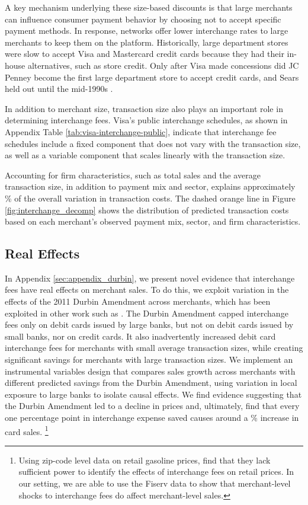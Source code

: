 \documentclass[main.tex]{subfiles}
\begin{document}
A key mechanism underlying these size-based discounts is that large merchants can influence consumer payment behavior by choosing not to accept specific payment methods.
In response, networks offer lower interchange rates to large merchants to keep them on the platform.
Historically, large department stores were slow to accept Visa and Mastercard credit cards because they had their in-house alternatives, such as store credit.
Only after Visa made concessions did JC Penney become the first large department store to accept credit cards, and Sears held out until the mid-1990s \citep{Nocera1995}.

In addition to merchant size, transaction size also plays an important role in determining interchange fees.
Visa's public interchange schedules, as shown in Appendix Table \ref{tab:visa-interchange-public}, indicate that interchange fee schedules include a fixed component that does not vary with the transaction size, as well as a variable component that scales linearly with the transaction size.

Accounting for firm characteristics, such as total sales and the average transaction size, in addition to payment mix and sector, explains approximately \% of the overall variation in transaction costs.
The dashed orange line in Figure \ref{fig:interchange_decomp} shows the distribution of predicted transaction costs based on each merchant's observed payment mix, sector, and firm characteristics.

\subsection{Real Effects}

In Appendix \ref{sec:appendix_durbin}, we present novel evidence that interchange fees have real effects on merchant sales. To do this, we exploit variation in the effects of the 2011 Durbin Amendment across merchants, which has been exploited in other work such as \citet{Mukharlyamov.Sarin2025}. The Durbin Amendment capped interchange fees only on debit cards issued by large banks, but not on debit cards issued by small banks, nor on credit cards. It also inadvertently increased debit card interchange fees for merchants with small average transaction sizes, while creating significant savings for merchants with large transaction sizes. We implement an instrumental variables design that compares sales growth across merchants with different predicted savings from the Durbin Amendment, using variation in local exposure to large banks to isolate causal effects. We find evidence suggesting that the Durbin Amendment led to a decline in prices and, ultimately, find that every one percentage point in interchange expense saved causes around a \% increase in card sales. \footnote{Using zip-code level data on retail gasoline prices, \citet{Mukharlyamov.Sarin2025} find that they lack sufficient power to identify the effects of interchange fees on retail prices. In our setting, we are able to use the Fiserv data to show that merchant-level shocks to interchange fees do affect merchant-level sales.}
\end{document}
